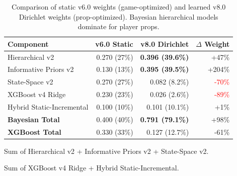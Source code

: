 \begin{table}[h]
\centering
\caption[v6.0 vs v8.0 Dirichlet weight comparison]{Comparison of static v6.0 weights (game-optimized) and learned v8.0 Dirichlet weights (prop-optimized). Bayesian hierarchical models dominate for player props.}
\label{tab:weight-comparison}
\begin{threeparttable}
\begin{tabular}{@{}lrrr@{}}
\toprule
\textbf{Component} & \textbf{v6.0 Static} & \textbf{v8.0 Dirichlet} & \textbf{$\Delta$ Weight} \\
\midrule
Hierarchical v2 & 0.270 (27\%) & \textbf{0.396 (39.6\%)} & +47\% \\
Informative Priors v2 & 0.130 (13\%) & \textbf{0.395 (39.5\%)} & +204\% \\
State-Space v2 & 0.270 (27\%) & 0.082 (8.2\%) & \textcolor{red}{-70\%} \\
XGBoost v4 Ridge & 0.230 (23\%) & 0.026 (2.6\%) & \textcolor{red}{-89\%} \\
Hybrid Static-Incremental & 0.100 (10\%) & 0.101 (10.1\%) & +1\% \\
\midrule
\textbf{Bayesian Total}\tnote{a} & 0.400 (40\%) & \textbf{0.791 (79.1\%)} & +98\% \\
\textbf{XGBoost Total}\tnote{b} & 0.330 (33\%) & 0.127 (12.7\%) & -61\% \\
\bottomrule
\end{tabular}
\begin{tablenotes}
\footnotesize
\item[a] Sum of Hierarchical v2 + Informative Priors v2 + State-Space v2.
\item[b] Sum of XGBoost v4 Ridge + Hybrid Static-Incremental.
\end{tablenotes}
\end{threeparttable}
\end{table}

